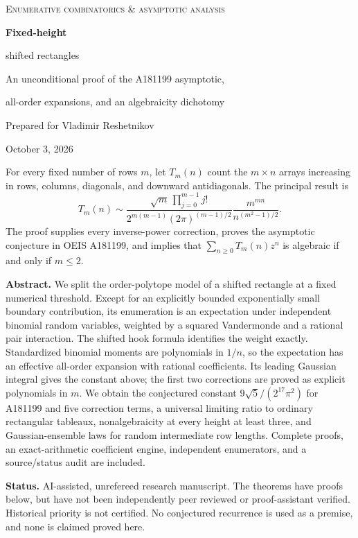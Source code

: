 \documentclass[11pt,letterpaper]{article}
\numberwithin{equation}{section}
\theoremstyle{definition}
\newcommand{\1}{\mathbf 1}
\begin{document}
\hypersetup{pageanchor=false}
\begin{titlepage}
\vspace*{0.45in}
{\color{inkblue}\large\textsc{Enumerative combinatorics \& asymptotic analysis}\par}
\vspace{0.3in}
{\color{inkblue}\Huge\bfseries Fixed-height\par shifted rectangles\par}
\vspace{0.25in}
{\Large An unconditional proof of the A181199 asymptotic,\par
all-order expansions, and an algebraicity dichotomy\par}
\vspace{0.35in}
{\large Prepared for Vladimir Reshetnikov\par}
{\large October 3, 2026\par}
\vspace{0.35in}
\begin{resultbox}
For every fixed number of rows $m$, let $T_m(n)$ count the $m\times n$
arrays increasing in rows, columns, diagonals, and downward antidiagonals.
The principal result is
\[
T_m(n)\sim
\frac{\sqrt m\,\prod_{j=0}^{m-1}j!}
 {2^{m(m-1)}(2\pi)^{(m-1)/2}}
\frac{m^{mn}}{n^{(m^2-1)/2}}.
\]
The proof supplies every inverse-power correction, proves the asymptotic
conjecture in OEIS A181199, and implies that
$\sum_{n\ge0}T_m(n)z^n$ is algebraic if and only if $m\le2$.
\end{resultbox}
\vspace{0.18in}
\noindent\textbf{Abstract.}
We split the order-polytope model of a shifted rectangle at a fixed numerical
threshold. Except for an explicitly bounded exponentially small boundary
contribution, its enumeration is an expectation under independent binomial
random variables, weighted by a squared Vandermonde and a rational pair
interaction. The shifted hook formula identifies the weight exactly.
Standardized binomial moments are polynomials in $1/n$, so the expectation
has an effective all-order expansion with rational coefficients. Its leading
Gaussian integral gives the constant above; the first two corrections are
proved as explicit polynomials in $m$. We obtain the conjectured constant
$9\sqrt5/(2^{17}\pi^2)$ for A181199 and five correction terms, a universal
limiting ratio to ordinary rectangular tableaux, nonalgebraicity at every
height at least three, and Gaussian-ensemble laws for random intermediate
row lengths. Complete proofs, an exact-arithmetic coefficient engine,
independent enumerators, and a source/status audit are included.

\vfill
\noindent\small\textbf{Status.} AI-assisted, unrefereed research manuscript.
The theorems have proofs below, but have not been independently peer reviewed
or proof-assistant verified. Historical priority is not certified. No
conjectured recurrence is used as a premise, and none is claimed proved here.
\end{titlepage}
\hypersetup{pageanchor=true}
\end{document}
